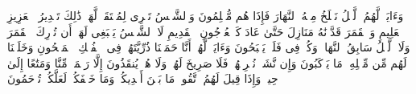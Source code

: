 \startbuffer[\q:36:37]
وَءَایَةࣱ لَّهُمُ ٱلَّیۡلُ نَسۡلَخُ مِنۡهُ ٱلنَّهَارَ فَإِذَا هُم مُّظۡلِمُونَ%
\stopbuffer%
\startbuffer[\q:36:38]
وَٱلشَّمۡسُ تَجۡرِی لِمُسۡتَقَرࣲّ لَّهَاۚ ذَٰلِكَ تَقۡدِیرُ ٱلۡعَزِیزِ ٱلۡعَلِیمِ%
\stopbuffer%
\startbuffer[\q:36:39]
وَٱلۡقَمَرَ قَدَّرۡنَٰهُ مَنَازِلَ حَتَّىٰ عَادَ كَٱلۡعُرۡجُونِ ٱلۡقَدِیمِ%
\stopbuffer%
\startbuffer[\q:36:40]
لَا ٱلشَّمۡسُ یَنۢبَغِی لَهَاۤ أَن تُدۡرِكَ ٱلۡقَمَرَ وَلَا ٱلَّیۡلُ سَابِقُ ٱلنَّهَارِۚ وَكُلࣱّ فِی فَلَكࣲ یَسۡبَحُونَ%
\stopbuffer%
\startbuffer[\q:36:41]
وَءَایَةࣱ لَّهُمۡ أَنَّا حَمَلۡنَا ذُرِّیَّتَهُمۡ فِی ٱلۡفُلۡكِ ٱلۡمَشۡحُونِ%
\stopbuffer%
\startbuffer[\q:36:42]
وَخَلَقۡنَا لَهُم مِّن مِّثۡلِهِۦ مَا یَرۡكَبُونَ%
\stopbuffer%
\startbuffer[\q:36:43]
وَإِن نَّشَأۡ نُغۡرِقۡهُمۡ فَلَا صَرِیخَ لَهُمۡ وَلَا هُمۡ یُنقَذُونَ%
\stopbuffer%
\startbuffer[\q:36:44]
إِلَّا رَحۡمَةࣰ مِّنَّا وَمَتَٰعًا إِلَىٰ حِینࣲ%
\stopbuffer%
\startbuffer[\q:36:45]
وَإِذَا قِیلَ لَهُمُ ٱتَّقُوا۟ مَا بَیۡنَ أَیۡدِیكُمۡ وَمَا خَلۡفَكُمۡ لَعَلَّكُمۡ تُرۡحَمُونَ%
\stopbuffer%
